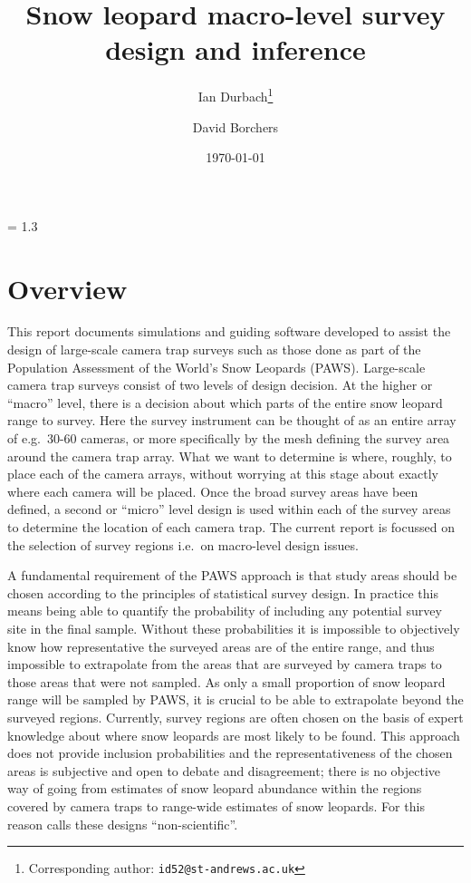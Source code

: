 \documentclass[a4paper,11pt, draft]{article} %
\begin{document}
\baselineskip = 1.3\baselineskip 
\title{Snow leopard macro-level survey design and inference}
\author[1]{Ian Durbach\footnote{Corresponding author: \texttt{id52@st-andrews.ac.uk}}}
\author[1]{David Borchers}
\date{\today}
\maketitle


\tableofcontents

\section{Overview}
This report documents simulations and guiding software developed to assist the design of large-scale camera trap surveys such as those done as part of the Population Assessment of the World's Snow Leopards (PAWS). Large-scale camera trap surveys consist of two levels of design decision. At the higher or ``macro'' level, there is a decision about which parts of the entire snow leopard range to survey. Here the survey instrument can be thought of as an entire array of e.g.\ 30-60 cameras, or more specifically by the mesh defining the survey area around the camera trap array. What we want to determine is where, roughly, to place each of the camera arrays, without worrying at this stage about exactly where each camera will be placed. Once the broad survey areas have been defined, a second or ``micro'' level design is used within each of the survey areas to determine the location of each camera trap. The current report is focussed on the selection of survey regions i.e.\ on macro-level design issues.

A fundamental requirement of the PAWS approach is that study areas should be chosen according to the principles of statistical survey design. In practice this means being able to quantify the probability of including any potential survey site in the final sample. Without these probabilities it is impossible to objectively know how representative the surveyed areas are of the entire range, and thus impossible to extrapolate from the areas that are surveyed by camera traps to those areas that were not sampled. As only a small proportion of snow leopard range will be sampled by PAWS, it is crucial to be able to extrapolate beyond the surveyed regions. Currently, survey regions are often chosen on the basis of expert knowledge about where snow leopards are most likely to be found. This approach does not provide inclusion probabilities and the representativeness of the chosen areas is subjective and open to debate and disagreement; there is no objective way of going from estimates of snow leopard abundance within the regions covered by camera traps to range-wide estimates of snow leopards. For this reason \cite{McDonald2012} calls these designs ``non-scientific''.
\end{document}
